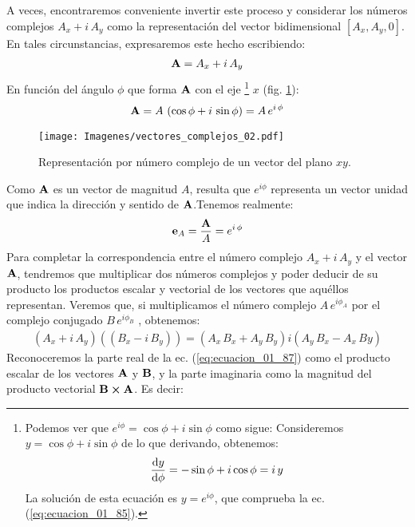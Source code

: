 \par 
A veces, encontraremos conveniente invertir este proceso y considerar los números complejos $A_{x} + i \, A_{y}$ como la representación del vector bidimensional $\left[ A_{x}, A_{y}, 0 \right]$. En tales circunstancias, expresaremos este hecho escribiendo:
\begin{align}
    \vb{A} = A_{x} + i \, A_{y}
    \label{eq:ecuacion_01_84}
\end{align}
En función del ángulo $\phi$ que forma $\vb{A}$ con el eje \footnote{Podemos ver que $e^{i \phi} = \cos \phi + i \sin \phi$ como sigue: Consideremos $y = \cos \phi +  i \sin \phi$ de lo que derivando, obtenemos:
\begin{align*}
    \dv{y}{\phi} = - \sin \phi + i \cos \phi = i \, y
\end{align*}
La solución de esta ecuación es $y = e^{i \phi}$, que comprueba la ec. (\ref{eq:ecuacion_01_85}).} $x$ (fig. \ref{fig:figura_01_24}):
\begin{align}
    \vb{A} = A \, \left( \cos \phi + i \, \sin \phi \right) = A \, e^{i \, \phi}
    \label{eq:ecuacion_01_85}
\end{align}
\begin{figure}[H]
    \centering
    \texttt{[image: Imagenes/vectores\_complejos\_02.pdf]}
    \caption{Representación por número complejo de un vector del plano $xy$.}
    \label{fig:figura_01_24}
\end{figure}
Como $\vb{A}$ es un vector de magnitud $A$, resulta que $e^{i \phi}$ representa un vector unidad que indica la dirección y sentido de $\vb{A}$.Tenemos realmente:
\begin{align}
    \vb{e}_{A} = \dfrac{\vb{A}}{A} = e^{i \, \phi}
    \label{eq:ecuacion_01_86}
\end{align}
Para completar la correspondencia entre el número complejo $A_{x} + i \, A_{y}$ y el vector $\vb{A}$, tendremos que multiplicar dos números complejos y poder deducir de su producto los productos escalar y vectorial de los vectores que aquéllos representan. Veremos que, si multiplicamos el número complejo $A \, e^{i \phi_{A}}$ por el complejo conjugado $B \, e^{i \phi_{B}}$ , obtenemos:
\begin{align}
    \left( A_{x} + i \, A_{y} \right) (\left( B_{x} - i \, B_{y} \right)) = \left( A_{x} \, B_{x} + A_{y} \, B_{y} \right) i \left( A_{y} \, B_{x} - A_{x} \, B{y} \right)
    \label{eq:ecuacion_01_87}
\end{align}
Reconoceremos la parte real de la ec. (\ref{eq:ecuacion_01_87}) como el producto escalar de los vectores $\vb{A}$ y $\vb{B}$, y la parte imaginaria como la magnitud del producto vectorial $\vb{B} \cp \vb{A}$. Es decir:
